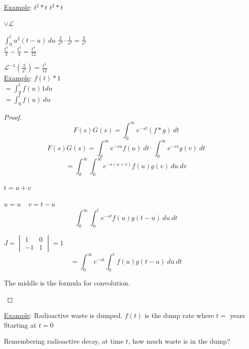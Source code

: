 \documentclass[12pt]{article}
\numberwithin{equation}{subsection}
\newcommand{\lap}{\mathscr{L}}
\newcommand{\indd}{\hspace{2cm}}
\newcommand{\indj}{\hspace{5cm}}
\newcommand{\indm}{\hspace{6.5cm}}
\newcommand{\inds}{\hspace{9.5cm}}
\newcommand{\indt}{\hspace{10cm}}
\newcommand{\indu}{\hspace{10.5cm}}
\newcommand{\exa}{\noindent \underline{Example}: \hspace{1cm}}
\begin{document}
\exa $t^2*t$ \indm $t^2*t$

\indt $\vee \lap$

\indd $\int_0^t u^2(t-u)\ du$ \indj $\frac{2}{s^3}\cdot \frac{1}{s^2} = \frac{2}{s^5}$\\

\indd $\frac{t^4}{3} - \frac{t^4}{4} = \frac{t^4}{12}$

\inds $\lap^{-1}(\frac{2}{s^5})=\frac{t^4}{12}$\\


\exa $f(t)*1$\\

\indd $=\int_0^t f(u)1 du$\\

\indd $=\int_0^t f(u)\ du$

\newpage

\begin{proof}\begin{equation}
F(s)G(s)= \int_0^\infty e^{-st} (f*g)\ dt
\end{equation}
\begin{equation}
F(s)G(s)= \int_0^\infty e^{-su} f(u) \ dt \cdot \int_0^\infty e^{-sv} g(v)\ dt
\end{equation}
\begin{equation}
=\int_0^\infty \int_0^\infty  e^{-s(u+v)}f(u)g(v)\ du\ dv
\end{equation}

\indu $t=u+v$

\indu $u=u\ \ \ \ \ v=t-u$
\begin{equation}
\int_0^\infty \int_0^t e^{-st} f(u) g(t-u) \ du\ dt
\end{equation}

\inds $J= \begin{vmatrix}
1 & 0 \\
-1 & 1 
\end{vmatrix}  =1$
\begin{equation}
=\int_0^\infty e^{-st} \int_0^t f(u)g(t-u) \ du \ dt
\end{equation}
\begin{center}
The middle is the formula for convolution.
\end{center}
\end{proof}

\exa Radioactive waste is dumped. $f(t)$ is the dump rate where $t=$ years\\



Starting at $t=0$

Remembering radioactive decay, at time $t$, how much waste is in the dump?\\
\end{document}
